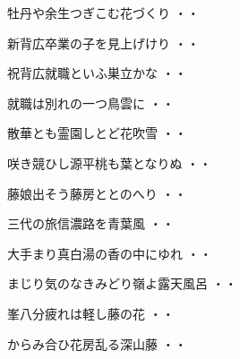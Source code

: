 \begin{shiika}牡丹や余生つぎこむ花づくり
\hfill{・・}\end{shiika}
\vspace{0.6cm}
\begin{shiika}新背広卒業の子を見上げけり
\hfill{・・}\end{shiika}
\vspace{0.6cm}
\begin{shiika}祝背広就職といふ巣立かな
\hfill{・・}\end{shiika}
\vspace{0.6cm}
\begin{shiika}就職は別れの一つ鳥雲に
\hfill{・・}\end{shiika}
\vspace{0.6cm}
\begin{shiika}散華とも霊園しとど花吹雪
\hfill{・・}\end{shiika}
\vspace{0.6cm}
\begin{shiika}咲き競ひし源平桃も葉となりぬ
\hfill{・・}\end{shiika}
\vspace{0.6cm}
\begin{shiika}藤娘出そう藤房ととのへり
\hfill{・・}\end{shiika}
\vspace{0.6cm}
\begin{shiika}三代の旅信濃路を青葉風
\hfill{・・}\end{shiika}
\vspace{0.6cm}
\begin{shiika}大手まり真白湯の香の中にゆれ
\hfill{・・}\end{shiika}
\vspace{0.6cm}
\begin{shiika}まじり気のなきみどり嶺よ露天風呂
\hfill{・・}\end{shiika}
\vspace{0.6cm}
\begin{shiika}峯八分疲れは軽し藤の花
\hfill{・・}\end{shiika}
\vspace{0.6cm}
\begin{shiika}からみ合ひ花房乱る深山藤
\hfill{・・}\end{shiika}
